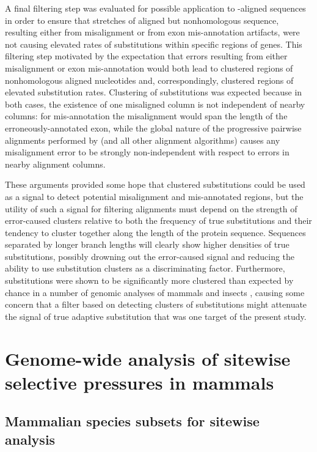 A final filtering step was evaluated for possible application to
\prank{}-aligned sequences in order to ensure that stretches of
aligned but nonhomologous sequence, resulting either from misalignment
or from exon mis-annotation artifacts, were not causing elevated rates
of \nsyn substitutions within specific regions of genes. This
filtering step motivated by the expectation that errors resulting from
either misalignment or exon mis-annotation would both lead to
clustered regions of nonhomologous aligned nucleotides and,
correspondingly, clustered regions of elevated \nsyn substitution
rates. Clustering of \nsyn substitutions was expected because in both
cases, the existence of one misaligned column is not independent of
nearby columns: for mis-annotation the misalignment would span the
length of the erroneously-annotated exon, while the global nature of
the progressive pairwise alignments performed by \prank{} (and all
other alignment algorithms) causes any misalignment error to be
strongly non-independent with respect to errors in nearby alignment
columns.

These arguments provided some hope that clustered \nsyn substitutions
could be used as a signal to detect potential misalignment and
mis-annotated regions, but the utility of such a signal for filtering
alignments must depend on the strength of error-caused \nsyn clusters
relative to both the frequency of true \nsyn substitutions and their
tendency to cluster together along the length of the protein
sequence. Sequences separated by longer branch lengths will clearly
show higher densities of true \nsyn substitutions, possibly drowning
out the error-caused signal and reducing the ability to use
substitution clusters as a discriminating factor. Furthermore, \nsyn
substitutions were shown to be significantly more clustered than
expected by chance in a number of genomic analyses of mammals and
insects \citep{Callahan2011,Bazykin2004,Wang2007}, causing some
concern that a filter based on detecting clusters of \nsyn
substitutions might attenuate the signal of true adaptive substitution
that was one target of the present study.


\section{Genome-wide analysis of sitewise selective pressures in mammals}

\subsection{Mammalian species subsets for sitewise analysis}

